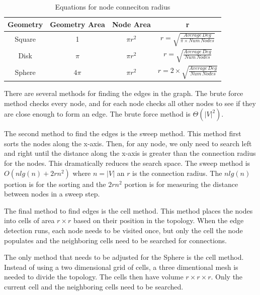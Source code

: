 \documentclass{article}
\begin{document}
        \begin{center}
            \begin{table}[h]
                \centering
                \begin{tabular}{|c|c|c|c|}
                    \hline
                    Geometry & Geometry Area & Node Area & r \\
                    \hline
                    Square & 1 & $\pi r^2$ & $r = \sqrt{\frac{Average\,Deg}{\pi \times Num\,Nodes}}$ \\
                    Disk & $\pi$ & $\pi r^2$ & $r = \sqrt{\frac{Average\,Deg}{Num\,Nodes}}$ \\
                    Sphere & $4\pi$ & $\pi r^2$ & $r = 2 \times \sqrt{\frac{Average\,Deg}{Num\,Nodes}}$ \\
                    \hline
                \end{tabular}

                \caption{Equations for node conneciton radius}
                \label{tab4}
            \end{table}
        \end{center}

        There are several methods for finding the edges in the graph. The brute force method checks every node, and for each node checks all other nodes to see if they are close enough to form an edge. The brute force method is $\Theta\left(|V|^2\right)$.
        \par
        The second method to find the edges is the sweep method. This method first sorts the nodes along the x-axis. Then, for any node, we only need to search left and right until the distance along the x-axis is greater than the connection radius for the nodes. This dramatically reduces the search space. The sweep method is $O\left(n lg(n) + 2rn^2\right)$ where $n = |V|$ an $r$ is the connection radius. The $n lg(n)$ portion is for the sorting and the $2rn^2$ portion is for measuring the distance between nodes in a sweep step.
        \par
        The final method to find edges is the cell method. This method places the nodes into cells of area $r \times r$ based on their position in the topology. When the edge detection runs, each node needs to be visited once, but only the cell the node populates and the neighboring cells need to be searched for connections.
        \par
        The only method that needs to be adjusted for the Sphere is the cell method. Instead of using a two dimensional grid of cells, a three dimentional mesh is needed to divide the topology. The cells then have volume $r \times r \times r$. Only the current cell and the neighboring cells need to be searched.
\end{document}
